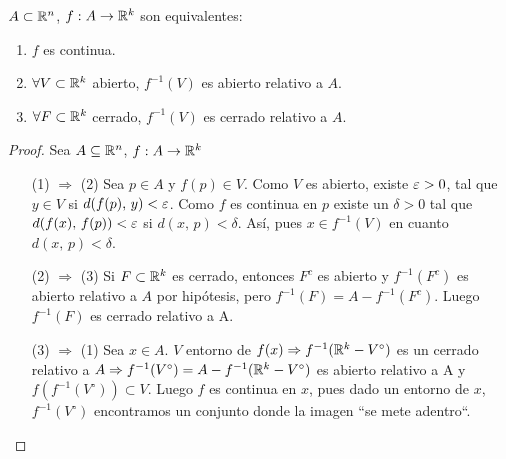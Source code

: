 \begin{prop}
  \(A \subset \mathbb{R}^n \), \(f: A \to \mathbb{R}^k\) son equivalentes:
  \begin{enumerate}
    \item \(f\) es continua.
    \item \(\forall V \subset \mathbb{R}^k\) abierto, \(f^{-1}(V)\) es abierto relativo a \(A\).
    \item \(\forall F \subset \mathbb{R}^k\) cerrado, \(f^{-1}(V)\) es cerrado relativo a \(A\).
  \end{enumerate}
  \begin{proof} Sea \( A \subseteq \mathbb{R}^n \), \(f : A \to \mathbb{R}^k \)\begin{enumerate}
      \item[(1) \(\Rightarrow \) (2)] Sea \( p \in A \) y \( f(p) \in V \). Como \( V \) es abierto, existe \( \varepsilon > 0 \), tal que \( y \in V \) si \( d(f(p)\text{, }y) < \varepsilon \).
            Como \( f \) es continua en \( p \) existe un \( \delta > 0 \) tal que \( d(f(x)\text{, }f(p)) < \varepsilon \) si \( d(x\text{, }p) < \delta \). Así, pues \( x \in f^{-1}(V) \) en cuanto \( d(x\text{, }p) < \delta \).
      \item[(2) \(\Rightarrow \) (3)] Si \(F \subset \mathbb{R}^k\) es cerrado, entonces \(F^c\) es abierto y \(f^{-1}(F^c)\) es abierto relativo a \(A\) por hipótesis, pero \(f^{-1}(F) = A - f^{-1}(F^c)\). Luego \(f^{-1}(F)\) es cerrado relativo a A.
      \item[(3) \(\Rightarrow \) (1)] Sea \(x \in A\). \(V\) entorno de \(f(x) \Rightarrow f^{-1}(\mathbb{R}^k - V^{\circ})\) es un cerrado relativo a \(A \Rightarrow f^{-1}(V^{\circ}) = A - f^{-1}(\mathbb{R}^k - V^{\circ})\) es abierto relativo a A y \(f(f^{-1}(V^{\circ})) \subset V\). Luego \(f\) es continua en \(x\), pues dado un entorno de \(x\), \(f^{-1}(V^{\circ})\) encontramos un conjunto donde la imagen ``se mete adentro``.
    \end{enumerate}
  \end{proof}
\end{prop}

